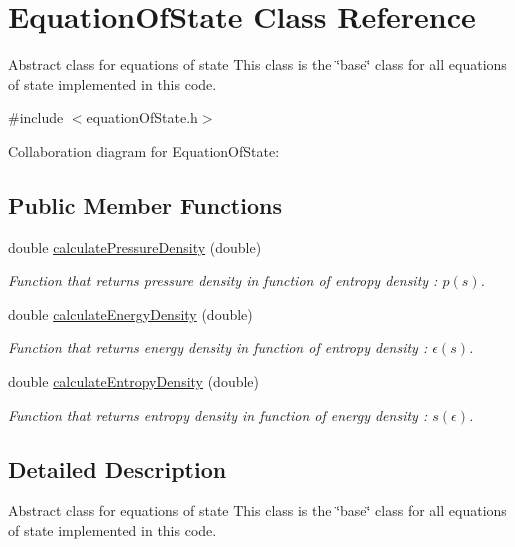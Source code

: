 \hypertarget{classEquationOfState}{}\section{Equation\+Of\+State Class Reference}
\label{classEquationOfState}


Abstract class for equations of state This class is the \char`\"{}base\char`\"{} class for all equations of state implemented in this code.  




{\ttfamily \#include $<$equation\+Of\+State.\+h$>$}



Collaboration diagram for Equation\+Of\+State\+:
\subsection*{Public Member Functions}
\begin{DoxyCompactItemize}
\item 
double \hyperlink{classEquationOfState_a80dd501203eb6240956ac8bdff1d71eb}{calculate\+Pressure\+Density} (double)
\begin{DoxyCompactList}\small\item\em Function that returns pressure density in function of entropy density \+: $p(s)$. \end{DoxyCompactList}\item 
double \hyperlink{classEquationOfState_a93deefbf7c66cd385659e0261eb12a90}{calculate\+Energy\+Density} (double)
\begin{DoxyCompactList}\small\item\em Function that returns energy density in function of entropy density \+: $\epsilon(s)$. \end{DoxyCompactList}\item 
double \hyperlink{classEquationOfState_a36608ee19a292006b52f20ad5172d378}{calculate\+Entropy\+Density} (double)
\begin{DoxyCompactList}\small\item\em Function that returns entropy density in function of energy density \+: $s(\epsilon)$. \end{DoxyCompactList}\end{DoxyCompactItemize}


\subsection{Detailed Description}
Abstract class for equations of state This class is the \char`\"{}base\char`\"{} class for all equations of state implemented in this code. 

